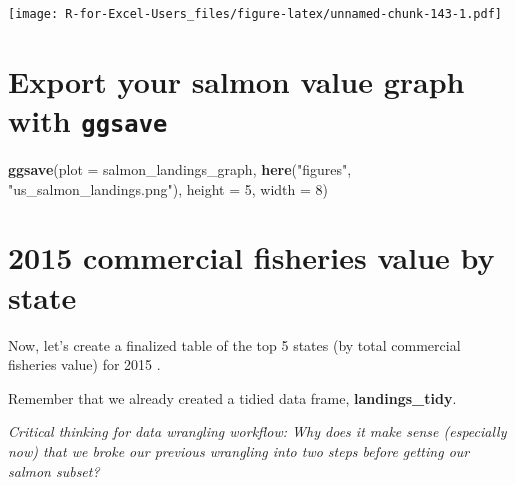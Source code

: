 \documentclass[]{book}
\newenvironment{Shaded}{\begin{snugshade}}{\end{snugshade}}
\newcommand{\DataTypeTok}[1]{\textcolor[rgb]{0.13,0.29,0.53}{#1}}
\newcommand{\DecValTok}[1]{\textcolor[rgb]{0.00,0.00,0.81}{#1}}
\newcommand{\KeywordTok}[1]{\textcolor[rgb]{0.13,0.29,0.53}{\textbf{#1}}}
\newcommand{\NormalTok}[1]{#1}
\newcommand{\OperatorTok}[1]{\textcolor[rgb]{0.81,0.36,0.00}{\textbf{#1}}}
\newcommand{\OtherTok}[1]{\textcolor[rgb]{0.56,0.35,0.01}{#1}}
\newcommand{\StringTok}[1]{\textcolor[rgb]{0.31,0.60,0.02}{#1}}
\begin{document}
\texttt{[image: R-for-Excel-Users\_files/figure-latex/unnamed-chunk-143-1.pdf]}

\hypertarget{export-your-salmon-value-graph-with-ggsave}{%
\section{\texorpdfstring{Export your salmon value graph with \texttt{ggsave}}{Export your salmon value graph with ggsave}}\label{export-your-salmon-value-graph-with-ggsave}}

\begin{Shaded}
\begin{Highlighting}[]
\KeywordTok{ggsave}\NormalTok{(}\DataTypeTok{plot =}\NormalTok{ salmon_landings_graph, }\KeywordTok{here}\NormalTok{(}\StringTok{"figures"}\NormalTok{, }\StringTok{"us_salmon_landings.png"}\NormalTok{),}
       \DataTypeTok{height =} \DecValTok{5}\NormalTok{, }\DataTypeTok{width =} \DecValTok{8}\NormalTok{)}
\end{Highlighting}
\end{Shaded}

\hypertarget{commercial-fisheries-value-by-state}{%
\section{2015 commercial fisheries value by state}\label{commercial-fisheries-value-by-state}}

Now, let's create a finalized table of the top 5 states (by total commercial fisheries value) for 2015 .

Remember that we already created a tidied data frame, \textbf{landings\_tidy}.

\emph{Critical thinking for data wrangling workflow: Why does it make sense (especially now) that we broke our previous wrangling into two steps before getting our salmon subset?}

\begin{Shaded}
\end{Shaded}
\end{document}

